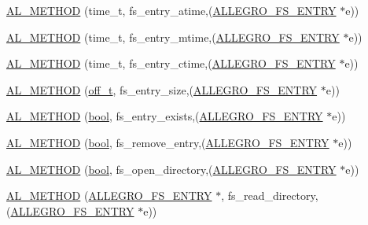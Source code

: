 \begin{DoxyCompactItemize}
\item 
\hyperlink{struct_a_l_l_e_g_r_o___f_s___i_n_t_e_r_f_a_c_e_a719724394644a0e005484d051f915813}{A\+L\+\_\+\+M\+E\+T\+H\+OD} (time\+\_\+t, fs\+\_\+entry\+\_\+atime,(\hyperlink{struct_a_l_l_e_g_r_o___f_s___e_n_t_r_y}{A\+L\+L\+E\+G\+R\+O\+\_\+\+F\+S\+\_\+\+E\+N\+T\+RY} $\ast$e))
\item 
\hyperlink{struct_a_l_l_e_g_r_o___f_s___i_n_t_e_r_f_a_c_e_a7703dc6b46ae215deb59fe9ceeae4c56}{A\+L\+\_\+\+M\+E\+T\+H\+OD} (time\+\_\+t, fs\+\_\+entry\+\_\+mtime,(\hyperlink{struct_a_l_l_e_g_r_o___f_s___e_n_t_r_y}{A\+L\+L\+E\+G\+R\+O\+\_\+\+F\+S\+\_\+\+E\+N\+T\+RY} $\ast$e))
\item 
\hyperlink{struct_a_l_l_e_g_r_o___f_s___i_n_t_e_r_f_a_c_e_ad5d411fd0ea037267e03e6d6f5cff635}{A\+L\+\_\+\+M\+E\+T\+H\+OD} (time\+\_\+t, fs\+\_\+entry\+\_\+ctime,(\hyperlink{struct_a_l_l_e_g_r_o___f_s___e_n_t_r_y}{A\+L\+L\+E\+G\+R\+O\+\_\+\+F\+S\+\_\+\+E\+N\+T\+RY} $\ast$e))
\item 
\hyperlink{struct_a_l_l_e_g_r_o___f_s___i_n_t_e_r_f_a_c_e_a94acc1827e3c0629ef8493e37b3084a2}{A\+L\+\_\+\+M\+E\+T\+H\+OD} (\hyperlink{fshook_8h_ab219cf84f750cf36312b756cb82d5e5e}{off\+\_\+t}, fs\+\_\+entry\+\_\+size,(\hyperlink{struct_a_l_l_e_g_r_o___f_s___e_n_t_r_y}{A\+L\+L\+E\+G\+R\+O\+\_\+\+F\+S\+\_\+\+E\+N\+T\+RY} $\ast$e))
\item 
\hyperlink{struct_a_l_l_e_g_r_o___f_s___i_n_t_e_r_f_a_c_e_ac6f995811510c3d16f465ee1e2b72f24}{A\+L\+\_\+\+M\+E\+T\+H\+OD} (\hyperlink{astdbool_8h_abb452686968e48b67397da5f97445f5b}{bool}, fs\+\_\+entry\+\_\+exists,(\hyperlink{struct_a_l_l_e_g_r_o___f_s___e_n_t_r_y}{A\+L\+L\+E\+G\+R\+O\+\_\+\+F\+S\+\_\+\+E\+N\+T\+RY} $\ast$e))
\item 
\hyperlink{struct_a_l_l_e_g_r_o___f_s___i_n_t_e_r_f_a_c_e_aba150e64fad18c9d4452afed96643452}{A\+L\+\_\+\+M\+E\+T\+H\+OD} (\hyperlink{astdbool_8h_abb452686968e48b67397da5f97445f5b}{bool}, fs\+\_\+remove\+\_\+entry,(\hyperlink{struct_a_l_l_e_g_r_o___f_s___e_n_t_r_y}{A\+L\+L\+E\+G\+R\+O\+\_\+\+F\+S\+\_\+\+E\+N\+T\+RY} $\ast$e))
\item 
\hyperlink{struct_a_l_l_e_g_r_o___f_s___i_n_t_e_r_f_a_c_e_a5c933dd8c56d7f701f2779b5140f49f3}{A\+L\+\_\+\+M\+E\+T\+H\+OD} (\hyperlink{astdbool_8h_abb452686968e48b67397da5f97445f5b}{bool}, fs\+\_\+open\+\_\+directory,(\hyperlink{struct_a_l_l_e_g_r_o___f_s___e_n_t_r_y}{A\+L\+L\+E\+G\+R\+O\+\_\+\+F\+S\+\_\+\+E\+N\+T\+RY} $\ast$e))
\item 
\hyperlink{struct_a_l_l_e_g_r_o___f_s___i_n_t_e_r_f_a_c_e_a1200b41bfc4e72d4fa936ecf0db91387}{A\+L\+\_\+\+M\+E\+T\+H\+OD} (\hyperlink{struct_a_l_l_e_g_r_o___f_s___e_n_t_r_y}{A\+L\+L\+E\+G\+R\+O\+\_\+\+F\+S\+\_\+\+E\+N\+T\+RY} $\ast$, fs\+\_\+read\+\_\+directory,(\hyperlink{struct_a_l_l_e_g_r_o___f_s___e_n_t_r_y}{A\+L\+L\+E\+G\+R\+O\+\_\+\+F\+S\+\_\+\+E\+N\+T\+RY} $\ast$e))

\end{DoxyCompactItemize}
